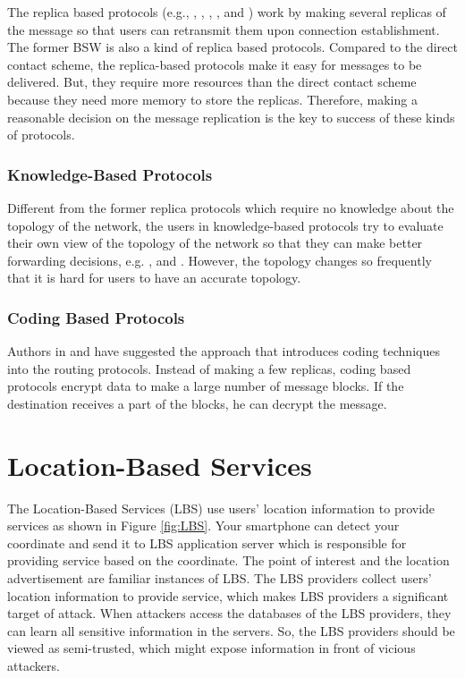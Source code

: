 \noindent The replica based protocols (e.g., \cite{C6}, \cite{C7}, \cite{C8}, \cite{C9}, and \cite{C37}) work by making several replicas of the message so that users can retransmit them upon connection establishment. The former BSW is also a kind of replica based protocols. Compared to the direct contact scheme, the replica-based protocols make it easy for messages to be delivered. But, they require more resources than the direct contact scheme because they need more memory to store the replicas. Therefore, making a reasonable decision on the message replication is the key to success of these kinds of protocols.


\subsubsection{  Knowledge-Based Protocols}

\noindent Different from the former replica protocols which require no knowledge about the topology of the network, the users in knowledge-based protocols try to evaluate their own view of the topology of the network so that they can make better forwarding decisions, e.g. \cite{C36}, \cite{C38} and \cite{C39}. However, the topology changes so frequently that it is hard for users to have an accurate topology.


\subsubsection{ Coding Based Protocols}

\noindent Authors in \cite {C12} and \cite {C13} have suggested the approach that introduces coding techniques into the routing protocols. Instead of making a few replicas, coding based protocols encrypt data to make a large number of message blocks. If the destination receives a part of the blocks, he can decrypt the message.

\section{Location-Based Services}

\noindent The Location-Based Services (LBS) use users' location information to provide services as shown in Figure \ref{fig:LBS}. Your smartphone can detect your coordinate and send it to LBS application server which is responsible for providing service based on the coordinate. The point of interest and the location advertisement are familiar instances of LBS. The LBS providers collect users' location information to provide service, which makes LBS providers a significant target of attack. When attackers access the databases of the LBS providers, they can learn all sensitive information in the servers. So, the LBS providers should be viewed as semi-trusted, which might expose information in front of vicious attackers.

